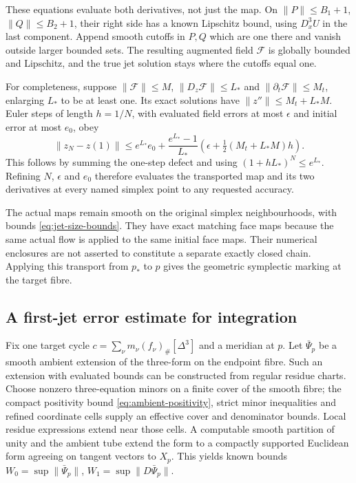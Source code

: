These equations evaluate both derivatives, not just the map. On
$\|P\|\le B_1+1$, $\|Q\|\le B_2+1$, their right side has a
known Lipschitz bound, using $D_x^3U$ in the last component.
Append smooth cutoffs in $P,Q$ which are one there and vanish
outside larger bounded sets. The resulting augmented field
$\mathcal F$ is globally bounded and Lipschitz, and the true
jet solution stays where the cutoffs equal one.

For completeness, suppose $\|\mathcal F\|\le M$,
$\|D_z\mathcal F\|\le L_*$ and
$\|\partial_t\mathcal F\|\le M_t$, enlarging $L_*$ to be at least
one. Its exact solutions have $\|z''\|\le M_t+L_*M$.
Euler steps of length $h=1/N$, with evaluated field errors at
most $\epsilon$ and initial error at most $e_0$, obey
\begin{equation}\label{eq:euler-jet-enclosure}
 \|z_N-z(1)\|\le e^{L_*}e_0+
       \frac{e^{L_*}-1}{L_*}
           \left(\epsilon+\tfrac12(M_t+L_*M)h\right).
\end{equation}
This follows by summing the one-step defect and using
$(1+hL_*)^N\le e^{L_*}$. Refining $N$, $\epsilon$ and $e_0$
therefore evaluates the transported map and its two derivatives
at every named simplex point to any requested accuracy.

The actual maps remain smooth on the original simplex
neighbourhoods, with bounds \eqref{eq:jet-size-bounds}.
They have exact matching face maps because the same actual flow
is applied to the same initial face maps. Their numerical
enclosures are not asserted to constitute a separate exactly
closed chain. Applying this transport from $p_*$ to $p$ gives
the geometric symplectic marking at the target fibre.

\subsection{A first-jet error estimate for integration}

Fix one target cycle
$c=\sum_\nu m_\nu(f_\nu)_\#[\Delta^3]$ and a meridian at $p$.
Let $\bar\Psi_p$ be a smooth ambient extension of the three-form
on the endpoint fibre. Such an extension with evaluated bounds
can be constructed from regular residue charts. Choose nonzero
three-equation minors on a finite cover of the smooth fibre;
the compact positivity bound \eqref{eq:ambient-positivity},
strict minor inequalities and refined coordinate cells supply
an effective cover and denominator bounds. Local residue
expressions extend near those cells. A computable smooth
partition of unity and the ambient tube extend the form to a
compactly supported Euclidean form agreeing on tangent vectors
to $X_p$. This yields known bounds
$W_0=\sup\|\bar\Psi_p\|$, $W_1=\sup\|D\bar\Psi_p\|$.


